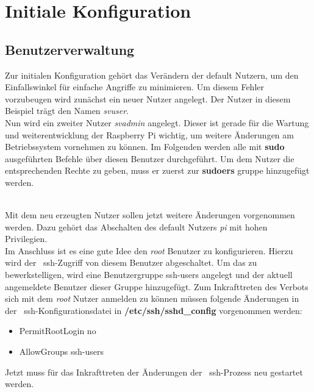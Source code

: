 
\section{Initiale Konfiguration}\label{sec:initiale-konfiguration}
\subsection{Benutzerverwaltung}\label{subsec: benutzerverwaltung}
Zur initialen Konfiguration gehört das Verändern der default Nutzern, um den Einfallswinkel für einfache Angriffe zu minimieren.
Um diesem Fehler vorzubeugen wird zunächst ein neuer Nutzer angelegt.
Der Nutzer in diesem Beispiel trägt den Namen \textit{svuser}. \\

Nun wird ein zweiter Nutzer \textit{svadmin} angelegt.
Dieser ist gerade für die Wartung und weiterentwicklung der Raspberry Pi wichtig, um weitere Änderungen am Betriebssystem vornehmen zu können.
Im Folgenden werden alle mit \textbf{sudo} ausgeführten Befehle über diesen Benutzer durchgeführt.
Um dem Nutzer die entsprechenden Rechte zu geben, muss er zuerst zur \textbf{sudoers} gruppe hinzugefügt werden.

\\
\blankline
Mit dem neu erzeugten Nutzer sollen jetzt weitere Änderungen vorgenommen werden.
Dazu gehört das Abschalten des default Nutzers \textit{pi} mit hohen Privilegien. \\

\blankline
Im Anschluss ist es eine gute Idee den \textit{root} Benutzer zu konfigurieren.
Hierzu wird der ~\gls{ssh}-Zugriff von diesem Benutzer abgeschaltet.
Um das zu bewerkstelligen, wird eine Benutzergruppe ssh-users angelegt und der aktuell angemeldete Benutzer dieser Gruppe hinzugefügt.
Zum Inkrafttreten des Verbots sich mit dem \textit{root} Nutzer anmelden zu können müssen folgende Änderungen in der ~\gls{ssh}-Konfigurationsdatei in \textbf{/etc/ssh/sshd\_config}\label{ssh-config-file} vorgenommen werden:
\begin{itemize}
    \item PermitRootLogin no
    \item AllowGroups ssh-users
\end{itemize}

Jetzt muss für das Inkrafttreten der Änderungen der ~\gls{ssh}-Prozess neu gestartet werden.


